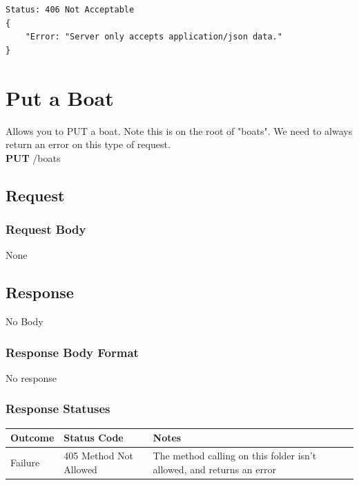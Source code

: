\documentclass[letterpaper,11pt,titlepage,draftclsnofoot,onecolumn,compsoc,utf8,latin1]{IEEEtran}
\begin{document}
\begin{singlespace}
\begin{lstlisting}[]
Status: 406 Not Acceptable
{
    "Error: "Server only accepts application/json data."
}
\end{lstlisting}

\newpage 

\normalsize

\section{Put a Boat}

Allows you to PUT a boat. Note this is on the root of "boats". We need to always return an error on this type of request.\\

\noindent \textbf{PUT} /boats

\subsection{Request}

\subsubsection{Request Body}

None

\subsection{Response}

No Body

\subsubsection{Response Body Format}

No response

\subsubsection{Response Statuses}

\begin{center}
\begin{tabular}{ |p{}|p{}|p{}| } 
 \hline
 \textbf{Outcome} & \textbf{Status Code} & \textbf{Notes}  \\  \hline
 Failure & 405 Method Not Allowed & The method calling on this folder isn't allowed, and returns an error \\
 \hline
\end{tabular}
\end{center}


\end{singlespace}
\end{document}
